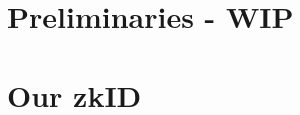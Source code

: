 \documentclass{iacrtrans}
\newcommand{\jbel}[1]{{\color{blue}{}jbel: #1}}
\newcommand{\ndhy}[2]{{\color{blue}{}ndhy: #2}}
\begin{document}


\section{Preliminaries - WIP}
\label{sec:preliminaries}


        

\section{Our zkID}
\label{sec:contribution}

\end{document}
